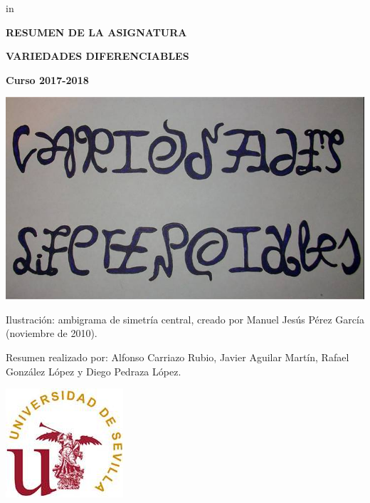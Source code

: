 \documentclass[twoside]{report}
\begin{document}
 in

\thispagestyle{empty}

\begin{center}
{\Large \bf RESUMEN DE LA ASIGNATURA}
\end{center}
\begin{center}
{\LARGE \bf VARIEDADES DIFERENCIABLES}
\end{center}
\begin{center}
{\Large \bf Curso 2017-2018}
\end{center}

\author{Alfonso Carriazo Rubio\\ Javier Aguilar Martín\\ Rafael González López\\ Diego Pedraza López}
	
\vspace{1.5cm}

\begin{center}
\includegraphics{ambigrama_big.jpg}
\end{center}

\noindent Ilustración: ambigrama de simetría central,
creado por Manuel Jesús Pérez García (noviembre de 2010).

\noindent Resumen realizado por: Alfonso Carriazo Rubio, Javier Aguilar Martín, Rafael González López y Diego Pedraza López.

\vspace{1.5cm}

\begin{center}
\includegraphics{sellous4.jpg}
\end{center}
\end{document}
